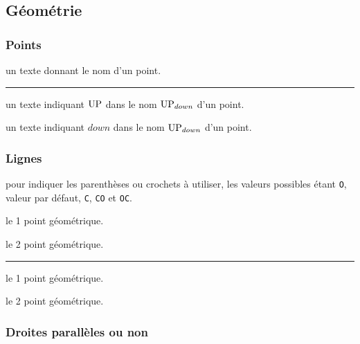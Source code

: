 \documentclass[12pt,a4paper]{article}
\theoremstyle{definition}
\newcommand\separation{
	\medskip
	\hfill\rule{0.5\textwidth}{0.75pt}\hfill
	\medskip
}
\newcommand\extraspace{
	\vspace{0.25em}
}
\begin{document}
\subsection{Géométrie}

\subsubsection{Points}


\IDarg{} un texte donnant le nom d'un point.


\separation



 un texte indiquant $\pt{UP}$ dans le nom $\pt*{UP}{down}$ d'un point.

 un texte indiquant $down$ dans le nom $\pt*{UP}{down}$ d'un point.





\subsubsection{Lignes}



\IDoption{} pour indiquer les parenthèses ou crochets à utiliser, les valeurs possibles étant \verb+O+, valeur par défaut, \verb+C+, \verb+CO+ et \verb+OC+.

 le 1\ier{} point géométrique.

 le 2\ieme{} point géométrique.


\separation




\extraspace



 le 1\ier{} point géométrique.

 le 2\ieme{} point géométrique.





\subsubsection{Droites parallèles ou non}
\end{document}
